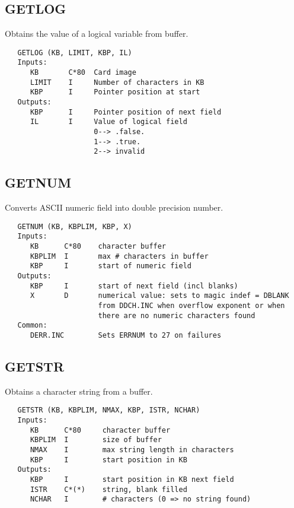\subsection{GETLOG}
Obtains the value of a logical variable from buffer.
\begin{verbatim}
   GETLOG (KB, LIMIT, KBP, IL)
   Inputs:
      KB       C*80  Card image
      LIMIT    I     Number of characters in KB
      KBP      I     Pointer position at start
   Outputs:
      KBP      I     Pointer position of next field
      IL       I     Value of logical field
                     0--> .false.
                     1--> .true.
                     2--> invalid
\end{verbatim}

\subsection{GETNUM}
Converts ASCII numeric field into double precision number.
\begin{verbatim}
   GETNUM (KB, KBPLIM, KBP, X)
   Inputs:
      KB      C*80    character buffer
      KBPLIM  I       max # characters in buffer
      KBP     I       start of numeric field
   Outputs:
      KBP     I       start of next field (incl blanks)
      X       D       numerical value: sets to magic indef = DBLANK
                      from DDCH.INC when overflow exponent or when
                      there are no numeric characters found
   Common:
      DERR.INC        Sets ERRNUM to 27 on failures
\end{verbatim}

\subsection{GETSTR}
Obtains a character string from a buffer.
\begin{verbatim}
   GETSTR (KB, KBPLIM, NMAX, KBP, ISTR, NCHAR)
   Inputs:
      KB      C*80     character buffer
      KBPLIM  I        size of buffer
      NMAX    I        max string length in characters
      KBP     I        start position in KB
   Outputs:
      KBP     I        start position in KB next field
      ISTR    C*(*)    string, blank filled
      NCHAR   I        # characters (0 => no string found)
\end{verbatim}

